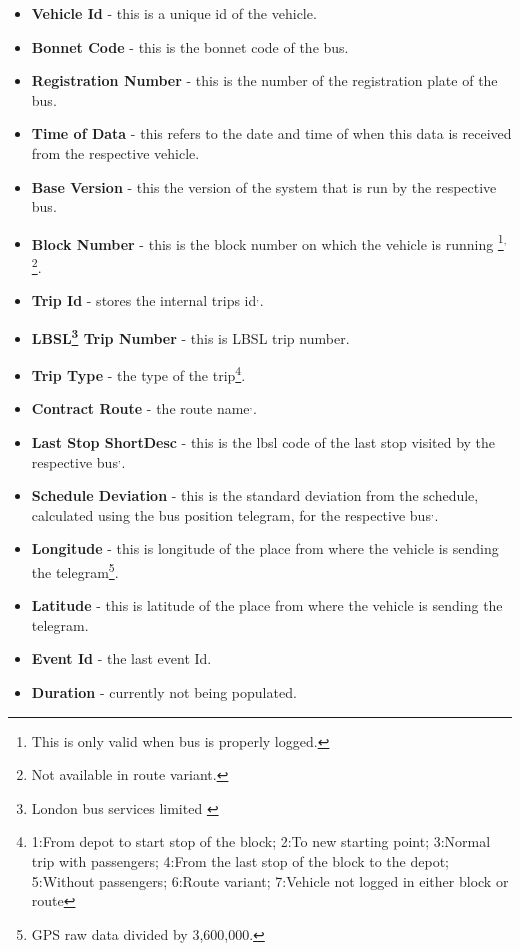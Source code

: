 \begin{itemize}
	\item \textbf{Vehicle Id} - this is a unique id of the vehicle.
	\item \textbf{Bonnet Code} - this is the bonnet code of the bus.
	\item \textbf{Registration Number} - this is the number of the registration plate of the bus. 
	\item \textbf{Time of Data} -  this refers to the date and time of when this data is received from the respective vehicle.
	\item \textbf{Base Version} - this the version of the system that is run by the respective bus.
	\item \textbf{Block Number} - this is the block number on which the vehicle is running
	\footnote{\label{loggedProperly}This is only valid when bus is properly logged.}$^{,}$\footnote{\label{routeVariant}Not available in route variant.}.
	\item \textbf{Trip Id} - stores the internal trips id\footnotemark[\ref{loggedProperly}]$^{,}$\footnotemark[\ref{routeVariant}].
	\item \textbf{LBSL\footnote{London bus services limited \cite{lbsl}} Trip Number} - this is LBSL trip number\footnotemark[\ref{loggedProperly}].
	\item \textbf{Trip Type} - the type of the trip\footnote{1:From depot to start stop of the block; 2:To new starting point;  3:Normal trip with passengers; 4:From the last stop of the block to the depot; 5:Without passengers; 6:Route variant; 7:Vehicle not logged in either block or route}.
	\item \textbf{Contract Route} - the route name\footnotemark[\ref{loggedProperly}]$^{,}$\footnotemark[\ref{routeVariant}].
	\item \textbf{Last Stop ShortDesc} - this is the lbsl code of the last stop visited by the respective bus\footnotemark[\ref{loggedProperly}]$^{,}$\footnotemark[\ref{routeVariant}].
	\item \textbf{Schedule Deviation} - this is the standard deviation from the schedule, calculated using the bus position telegram, for the respective bus\footnotemark[\ref{loggedProperly}]$^{,}$\footnotemark[\ref{routeVariant}].
	\item \textbf{Longitude} - this is longitude of the place from where the vehicle is sending the telegram\footnote{\label{gps}GPS raw data divided by 3,600,000.}.
	\item \textbf{Latitude} - this is latitude of the place from where the vehicle is sending the telegram\footnotemark[\ref{gps}].
	\item \textbf{Event Id} - the last event Id.
	\item \textbf{Duration} - currently not being populated.
\end{itemize}

